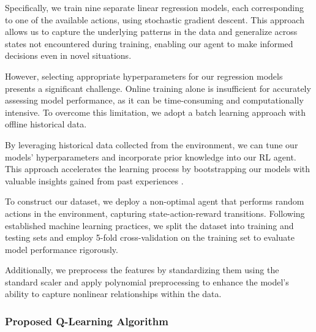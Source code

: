 Specifically, we train nine separate linear regression models, each corresponding to one of the available actions, using stochastic gradient descent. This approach allows us to capture the underlying patterns in the data and generalize across states not encountered during training, enabling our agent to make informed decisions even in novel situations.

However, selecting appropriate hyperparameters for our regression models presents a significant challenge. Online training alone is insufficient for accurately assessing model performance, as it can be time-consuming and computationally intensive. To overcome this limitation, we adopt a batch learning approach with offline historical data.

By leveraging historical data collected from the environment, we can tune our models' hyperparameters and incorporate prior knowledge into our RL agent. This approach accelerates the learning process by bootstrapping our models with valuable insights gained from past experiences \cite{cano2017curator,vukosi2015improved}.

To construct our dataset, we deploy a non-optimal agent that performs random actions in the environment, capturing state-action-reward transitions. Following established machine learning practices, we split the dataset into training and testing sets and employ 5-fold cross-validation on the training set to evaluate model performance rigorously.

Additionally, we preprocess the features by standardizing them using the standard scaler and apply polynomial preprocessing to enhance the model's ability to capture nonlinear relationships within the data.


\subsubsection{Proposed Q-Learning Algorithm}

